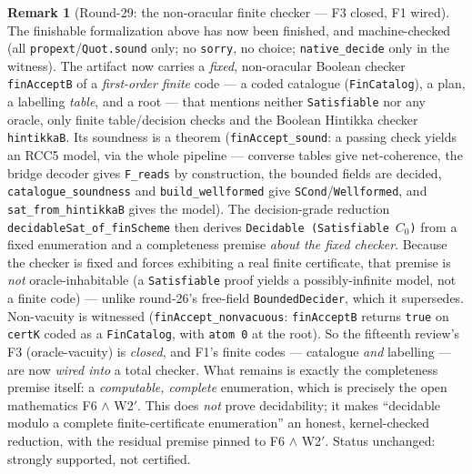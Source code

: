 \documentclass[11pt]{article}
\newcommand{\code}[1]{\texttt{#1}}
\theoremstyle{plain}
\theoremstyle{definition}
\newtheorem{remark}[theorem]{Remark}
\begin{document}
\begin{remark}[Round-29: the non-oracular finite checker --- F3 closed, F1 wired]
The finishable formalization above has now been finished, and
machine-checked (all \code{propext}/\code{Quot.sound} only; no
\code{sorry}, no choice; \code{native\_decide} only in the witness). The
artifact now carries a \emph{fixed}, non-oracular Boolean checker
\code{finAcceptB} of a \emph{first-order finite} code --- a coded
catalogue (\code{FinCatalog}), a plan, a labelling \emph{table}, and a
root --- that mentions neither \code{Satisfiable} nor any oracle, only
finite table/decision checks and the Boolean Hintikka checker
\code{hintikkaB}. Its soundness is a theorem (\code{finAccept\_sound}: a
passing check yields an RCC5 model, via the whole pipeline
--- converse tables give net-coherence, the bridge decoder gives
\code{F\_reads} by construction, the bounded fields are decided,
\code{catalogue\_soundness} and \code{build\_wellformed} give
\code{SCond}/\code{Wellformed}, and \code{sat\_from\_hintikkaB} gives the
model). The decision-grade reduction \code{decidableSat\_of\_finScheme}
then derives \code{Decidable (Satisfiable}~$C_0$\code{)} from a fixed
enumeration and a completeness premise \emph{about the fixed checker}.
Because the checker is fixed and forces exhibiting a real finite
certificate, that premise is \emph{not} oracle-inhabitable (a
\code{Satisfiable} proof yields a possibly-infinite model, not a finite
code) --- unlike round-26's free-field \code{BoundedDecider}, which it
supersedes. Non-vacuity is witnessed (\code{finAccept\_nonvacuous}:
\code{finAcceptB} returns \code{true} on \code{certK} coded as a
\code{FinCatalog}, with \code{atom 0} at the root). So the fifteenth
review's F3 (oracle-vacuity) is \emph{closed}, and F1's finite codes ---
catalogue \emph{and} labelling --- are now \emph{wired into} a total
checker. What remains is exactly the completeness premise itself: a
\emph{computable, complete} enumeration, which is precisely the open
mathematics F6 $\wedge$ W2$'$. This does \emph{not} prove decidability;
it makes ``decidable modulo a complete finite-certificate enumeration''
an honest, kernel-checked reduction, with the residual premise pinned to
F6 $\wedge$ W2$'$. Status unchanged: strongly supported, not certified.
\end{remark}
\end{document}
